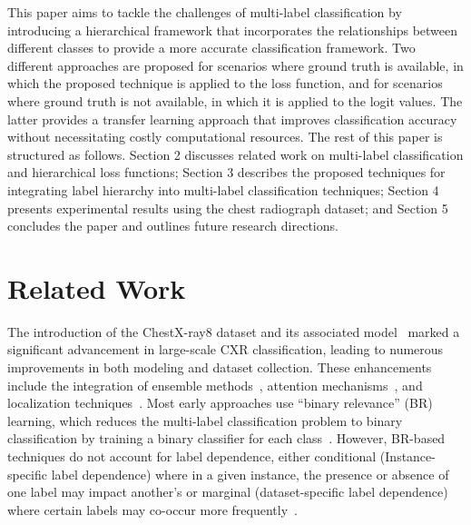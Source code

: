 This paper aims to tackle the challenges of multi-label classification by introducing a hierarchical framework that incorporates the relationships between different classes to provide a more accurate classification framework. Two different approaches are proposed for scenarios where ground truth is available, in which the proposed technique is applied to the loss function, and for scenarios where ground truth is not available, in which it is applied to the logit values. The latter provides a transfer learning approach that improves classification accuracy without necessitating costly computational resources. The rest of this paper is structured as follows. Section 2 discusses related work on multi-label classification and hierarchical loss functions; Section 3 describes the proposed techniques for integrating label hierarchy into multi-label classification techniques; Section 4 presents experimental results using the chest radiograph dataset; and Section 5 concludes the paper and outlines future research directions.


\section{Related Work}

The introduction of the ChestX-ray8 dataset and its associated model~\cite{wang_ChestXRay8_2017} marked a significant advancement in large-scale CXR classification, leading to numerous improvements in both modeling and dataset collection. These enhancements include the integration of ensemble methods~\cite{islam_Abnormality_2017}, attention mechanisms~\cite{guan_Diagnose_2018,liu_SDFN_2019}, and localization techniques~\cite{cai_Iterative_2018,guendel_MultiTask_2019,li_Thoracic_2018,yan_Weakly_2018}. Most early approaches use ``binary relevance'' (BR) learning, which reduces the multi-label classification problem to binary classification by training a binary classifier for each class~\cite{zhang_Review_2014}. However, BR-based techniques do not account for label dependence, either conditional (Instance-specific label dependence) where in a given instance, the presence or absence of one label may impact another's or marginal (dataset-specific label dependence) where certain labels may co-occur more frequently~\cite{dembczynski_Label_2012}.

